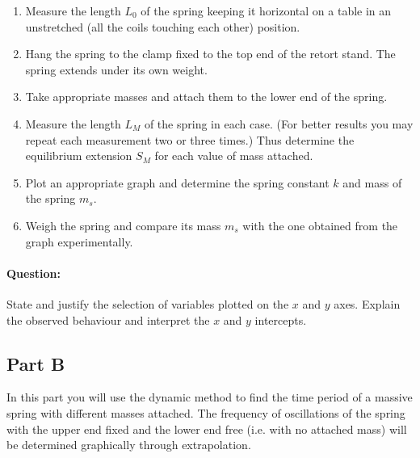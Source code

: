 \begin{enumerate}
\item Measure the length $L_0$ of the spring keeping it horizontal on a table in an unstretched (all the coils touching each other) position.
\item Hang the spring to the clamp fixed to the top end of the retort stand. The spring extends under its own weight.
\item Take appropriate masses and attach them to the lower end of the spring. 
\item Measure the length $L_M$ of the spring in each case. (For better results you may repeat
each measurement two or three times.) Thus determine the equilibrium extension $S_M$ for each value of mass attached.
\item Plot an appropriate graph and determine the spring constant $k$ and mass of the spring $m_s$.
\item Weigh the spring and compare its mass $m_s$ with the one obtained from the graph experimentally.
\end{enumerate}

\begin{question}
\paragraph{Question:} State and justify the selection of variables plotted on the $x$ and $y$ axes. Explain the observed behaviour and interpret the $x$ and $y$ intercepts.
\end{question}


\subsection*{Part B}

In this part you will use the dynamic method to find the time period of a massive spring with different masses attached. The frequency of oscillations of the spring with the upper end fixed and the lower end free (i.e. with no attached mass) will be determined graphically through extrapolation.

